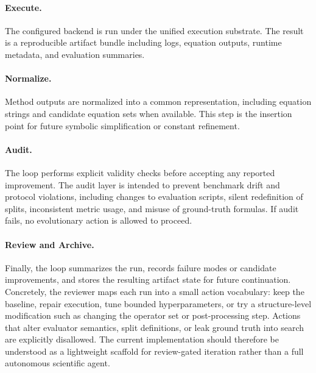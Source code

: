 \paragraph{Execute.}
The configured backend is run under the unified execution substrate. The result is a reproducible artifact bundle including logs, equation outputs, runtime metadata, and evaluation summaries.

\paragraph{Normalize.}
Method outputs are normalized into a common representation, including equation strings and candidate equation sets when available. This step is the insertion point for future symbolic simplification or constant refinement.

\paragraph{Audit.}
The loop performs explicit validity checks before accepting any reported improvement. The audit layer is intended to prevent benchmark drift and protocol violations, including changes to evaluation scripts, silent redefinition of splits, inconsistent metric usage, and misuse of ground-truth formulas. If audit fails, no evolutionary action is allowed to proceed.

\paragraph{Review and Archive.}
Finally, the loop summarizes the run, records failure modes or candidate improvements, and stores the resulting artifact state for future continuation. Concretely, the reviewer maps each run into a small action vocabulary: keep the baseline, repair execution, tune bounded hyperparameters, or try a structure-level modification such as changing the operator set or post-processing step. Actions that alter evaluator semantics, split definitions, or leak ground truth into search are explicitly disallowed. The current implementation should therefore be understood as a lightweight scaffold for review-gated iteration rather than a full autonomous scientific agent.
